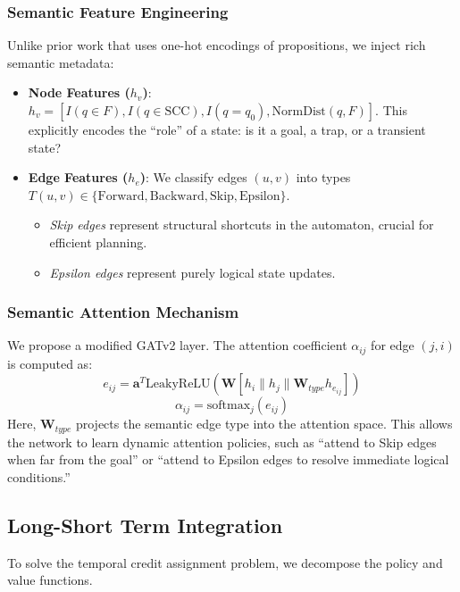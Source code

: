 \documentclass{article}
\begin{document}
\subsubsection{Semantic Feature Engineering}
Unlike prior work that uses one-hot encodings of propositions, we inject rich semantic metadata:
\begin{itemize}
    \item \textbf{Node Features ($h_v$)}: $h_v = [I(q \in F), I(q \in \text{SCC}), I(q=q_0), \text{NormDist}(q, F)]$. This explicitly encodes the ``role'' of a state: is it a goal, a trap, or a transient state?
    \item \textbf{Edge Features ($h_e$)}: We classify edges $(u, v)$ into types $T(u, v) \in \{\text{Forward}, \text{Backward}, \text{Skip}, \text{Epsilon}\}$.
    \begin{itemize}
        \item \textit{Skip edges} represent structural shortcuts in the automaton, crucial for efficient planning.
        \item \textit{Epsilon edges} represent purely logical state updates.
    \end{itemize}
\end{itemize}

\subsubsection{Semantic Attention Mechanism}
We propose a modified GATv2 layer. The attention coefficient $\alpha_{ij}$ for edge $(j, i)$ is computed as:
\begin{equation}
e_{ij} = \mathbf{a}^T \text{LeakyReLU}\left( \mathbf{W} [h_i \| h_j \| \mathbf{W}_{type} h_{e_{ij}}] \right)
\end{equation}
\begin{equation}
\alpha_{ij} = \text{softmax}_j(e_{ij})
\end{equation}
Here, $\mathbf{W}_{type}$ projects the semantic edge type into the attention space. This allows the network to learn dynamic attention policies, such as ``attend to Skip edges when far from the goal'' or ``attend to Epsilon edges to resolve immediate logical conditions.''

\subsection{Long-Short Term Integration}
To solve the temporal credit assignment problem, we decompose the policy and value functions.
\end{document}
